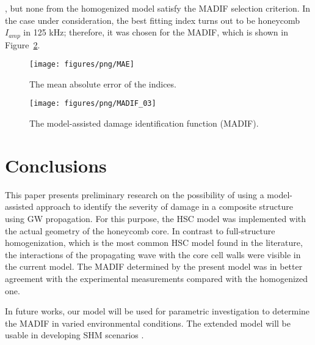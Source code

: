\documentclass[sensors,article,accept,moreauthors,pdftex]{Definitions/mdpi}
\begin{document}
\begin{paracol}{2}
, but none from the homogenized model satisfy the MADIF selection criterion.
In the case under consideration, the best fitting index turns out to be honeycomb \(I_{amp}\) in 125 kHz; therefore, it was chosen for the MADIF, which is shown in Figure~\ref{fig:MADIF}. 

\vspace{-6pt}
\begin{figure}[H]
		\texttt{[image: figures/png/MAE]}
	\caption{The %
 mean absolute error of the indices.}
	\label{fig:MAE}
\end{figure}
\vspace{-12pt}
\begin{figure}[H]
		\texttt{[image: figures/png/MADIF\_03]}
	\caption{The model-assisted damage identification function (MADIF).}
	\label{fig:MADIF}
\end{figure}

\section{Conclusions}
\label{sec:conc}
This paper presents preliminary research on the possibility of using a model-assisted approach to identify the severity of damage in a composite structure using GW propagation.
For this purpose, the HSC model was implemented with the actual geometry of the honeycomb core.
In contrast to  full-structure homogenization, which is the most common HSC model found in the literature, the interactions of the propagating wave with the core cell walls were visible in the current model.
The MADIF determined by  the present model was in better agreement with the experimental measurements compared with the homogenized one.

In  future works, our model will be used for parametric investigation to determine the MADIF in varied environmental conditions. 
The extended model will be usable in developing SHM scenarios%
.


\end{paracol}
\end{document}
